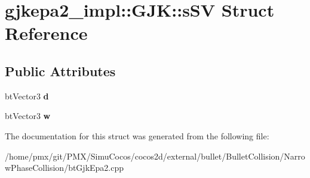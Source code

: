 \hypertarget{structgjkepa2__impl_1_1GJK_1_1sSV}{}\section{gjkepa2\+\_\+impl\+:\+:G\+JK\+:\+:s\+SV Struct Reference}
\label{structgjkepa2__impl_1_1GJK_1_1sSV}
\subsection*{Public Attributes}
\begin{DoxyCompactItemize}
\item 
\mbox{\label{structgjkepa2__impl_1_1GJK_1_1sSV_ac8906ecfd952ed195ec56f61681eb358}} 
bt\+Vector3 {\bfseries d}
\item 
\mbox{\label{structgjkepa2__impl_1_1GJK_1_1sSV_abdd688f396857f3993703df93fdcae56}} 
bt\+Vector3 {\bfseries w}
\end{DoxyCompactItemize}


The documentation for this struct was generated from the following file\+:\begin{DoxyCompactItemize}
\item 
/home/pmx/git/\+P\+M\+X/\+Simu\+Cocos/cocos2d/external/bullet/\+Bullet\+Collision/\+Narrow\+Phase\+Collision/bt\+Gjk\+Epa2.\+cpp\end{DoxyCompactItemize}
